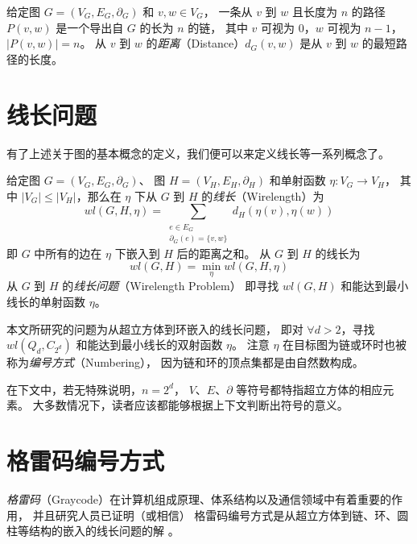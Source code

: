 给定图 $G = (V_G, E_G, \partial_G)$ 和 $v, w \in V_G$，
一条从 $v$ 到 $w$ 且长度为 $n$ 的路径 $P(v, w)$ 是一个导出自 $G$ 的长为 $n$ 的链，
其中 $v$ 可视为 $0$，$w$ 可视为 $n - 1$，$|P(v, w)| = n$。
从 $v$ 到 $w$ 的\emph{距离}（Distance）$d_G(v, w)$ 是从 $v$ 到 $w$ 的最短路径的长度。

\section{线长问题}
\label{Section 2.2}

有了上述关于图的基本概念的定义，我们便可以来定义线长等一系列概念了。

给定图 $G = (V_G, E_G, \partial_G)$、
图 $H = (V_H, E_H, \partial_H)$ 和单射函数 $\eta \colon V_G \rightarrow V_H$，
其中 $|V_G| \le |V_H|$，那么在 $\eta$ 下从 $G$ 到 $H$ 的\emph{线长}（Wirelength）为
\begin{equation}
wl(G, H, \eta) = \sum_{\substack{
	e \in E_G \\
	\partial_G(e) = \{v, w\}
}} d_H(\eta(v), \eta(w))
\end{equation}
即 $G$ 中所有的边在 $\eta$ 下嵌入到 $H$ 后的距离之和。
从 $G$ 到 $H$ 的线长为
\begin{equation}
wl(G, H) = \min_{\eta} wl(G, H, \eta)
\end{equation}
从 $G$ 到 $H$ 的\emph{线长问题}（Wirelength Problem）
即寻找 $wl(G, H)$ 和能达到最小线长的单射函数 $\eta$。

本文所研究的问题为从超立方体到环嵌入的线长问题，
即对 $\forall d > 2$，寻找 $wl(Q_d, C_{2^d})$ 和能达到最小线长的双射函数 $\eta$。
注意 $\eta$ 在目标图为链或环时也被称为\emph{编号方式}（Numbering），
因为链和环的顶点集都是由自然数构成。

在下文中，若无特殊说明，$n = 2^d$，
$V$、$E$、$\partial$ 等符号都特指超立方体的相应元素。
大多数情况下，读者应该都能够根据上下文判断出符号的意义。

\section{格雷码编号方式}
\label{Section 2.3}

\emph{格雷码}（Graycode）在计算机组成原理、体系结构以及通信领域中有着重要的作用，
并且研究人员已证明（或相信）
格雷码编号方式是从超立方体到链、环、圆柱等结构的嵌入的线长问题的解
\cite{Harper.1964,Guu.1997,Manuel.2011}。

